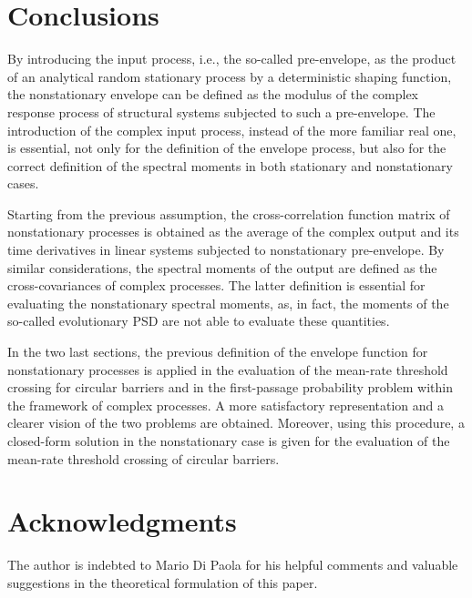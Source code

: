 \documentclass[12pt]{article}
\begin{document}
\section{Conclusions}
By introducing the input process, i.e., the so-called pre-envelope, as the product of an analytical random stationary process by a deterministic shaping function, the nonstationary envelope can be defined as the modulus of the complex response process of structural systems subjected to such a pre-envelope. The introduction of the complex input process, instead of the more familiar real one, is essential, not only for the definition of the envelope process, but also for the correct definition of the spectral moments in both stationary and nonstationary cases.

Starting from the previous assumption, the cross-correlation function matrix of nonstationary processes is obtained as the average of the complex output and its time derivatives in linear systems subjected to nonstationary pre-envelope. By similar considerations, the spectral moments of the output are defined as the cross-covariances of complex processes. The latter definition is essential for evaluating the nonstationary spectral moments, as, in fact, the moments of the so-called evolutionary PSD are not able to evaluate these quantities.

In the two last sections, the previous definition of the envelope function for nonstationary processes is applied in the evaluation of the mean-rate threshold crossing for circular barriers and in the first-passage probability problem within the framework of complex processes. A more satisfactory representation and a clearer vision of the two problems are obtained. Moreover, using this procedure, a closed-form solution in the nonstationary case is given for the evaluation of the mean-rate threshold crossing of circular barriers.

\section*{Acknowledgments}
The author is indebted to Mario Di Paola for his helpful comments and valuable suggestions in the theoretical formulation of this paper.

\appendix
\end{document}
